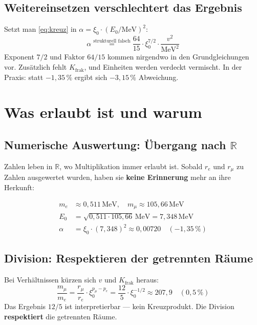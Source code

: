\subsection{Weitereinsetzen verschlechtert das Ergebnis}

Setzt man \eqref{eq:kreuz} in $\alpha = \xi_0 \cdot (E_0/\text{MeV})^2$:
\begin{equation}
  \alpha \stackrel{\text{strukturell falsch}}{=}
  \frac{64}{15} \cdot \xi_0^{7/2} \cdot \frac{v^2}{\text{MeV}^2}
\end{equation}
Exponent $7/2$ und Faktor $64/15$ kommen nirgendwo in den
Grundgleichungen vor. Zusätzlich fehlt $K_{\text{frak}}$,
und Einheiten werden verdeckt vermischt.
In der Praxis: statt $-1{,}35\,\%$ ergibt sich $-3{,}15\,\%$
Abweichung.

\section{Was erlaubt ist und warum}

\subsection{Numerische Auswertung: Übergang nach $\mathbb{R}$}

Zahlen leben in $\mathbb{R}$, wo Multiplikation immer erlaubt ist.
Sobald $r_e$ und $r_\mu$ zu Zahlen ausgewertet wurden, haben sie
\textbf{keine Erinnerung} mehr an ihre Herkunft:

\begin{align*}
  m_e &\approx 0{,}511\,\text{MeV}, \quad
  m_\mu \approx 105{,}66\,\text{MeV} \\
  E_0 &= \sqrt{0{,}511 \cdot 105{,}66}\,\text{MeV} = 7{,}348\,\text{MeV} \\
  \alpha &= \xi_0 \cdot (7{,}348)^2 \approx 0{,}00720 \quad (-1{,}35\,\%)
\end{align*}

\subsection{Division: Respektieren der getrennten Räume}

Bei Verhältnissen kürzen sich $v$ und $K_{\text{frak}}$ heraus:
\[
  \frac{m_\mu}{m_e}
  = \frac{r_\mu}{r_e} \cdot \xi_0^{p_\mu - p_e}
  = \frac{12}{5} \cdot \xi_0^{-1/2}
  \approx 207{,}9 \quad (0{,}5\,\%)
\]
Das Ergebnis $12/5$ ist interpretierbar --- kein Kreuzprodukt.
Die Division \textbf{respektiert} die getrennten Räume.

